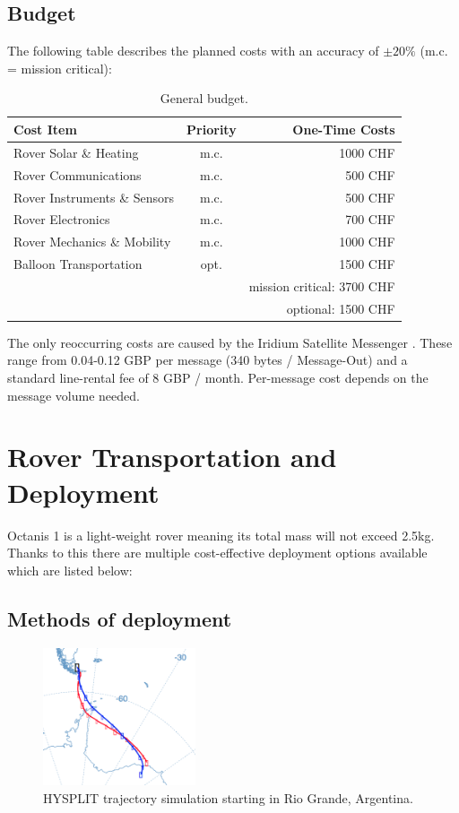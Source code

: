 \documentclass[a4paper,12pt]{article}
\begin{document}
\subsection{Budget}

The following table describes the planned costs with an accuracy of $\pm 20\%$ (m.c. = mission critical): \\ 

\begin{table}[h!]
\centering
\begin{tabular}{ l | c || r }
  Cost Item & Priority & One-Time Costs \\
  \hline
  Rover Solar \& Heating & m.c. & 1000 CHF \\
  Rover Communications & m.c. & 500 CHF \\
  Rover Instruments \& Sensors & m.c. & 500 CHF \\
  Rover Electronics & m.c. & 700 CHF \\
  Rover Mechanics \& Mobility & m.c. & 1000 CHF \\
  Balloon Transportation & opt. & 1500 CHF \\
  \hline \hline
  & & mission critical: 3700 CHF  \\
  & & optional: 1500 CHF \\
\end{tabular}
\caption{General budget.}
\end{table}


The only reoccurring costs are caused by the Iridium Satellite Messenger \cite{iridium}. These range from 0.04-0.12 GBP per message (340 bytes / Message-Out) and a standard line-rental fee of 8 GBP / month. Per-message cost depends on the message volume needed.



\section{Rover Transportation and Deployment}

Octanis 1 is a light-weight rover meaning its total mass will not exceed 2.5kg. Thanks to this there are multiple cost-effective deployment options available which are listed below:

\subsection{Methods of deployment}

\begin{figure}[h!]
	\centering
    \includegraphics[width=0.4\textwidth]{trajectory}
    \caption{HYSPLIT trajectory simulation starting in Rio Grande, Argentina.}
\end{figure}
\end{document}
